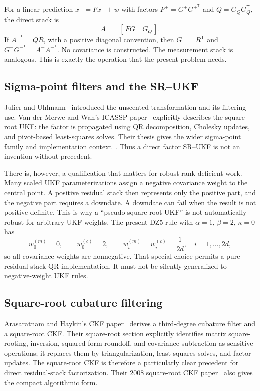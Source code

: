 \documentclass[11pt]{article}
\newcommand{\transpose}{^{\mathsf T}}
\begin{document}
For a linear prediction $x^-=Fx^++w$ with factors
$P^+=G^+G^{+\transpose}$ and $Q=G_QG_Q\transpose$, the direct stack is
\begin{equation}
 A^-=[\,FG^+\ \ G_Q\,].
 \label{eq:linear-pred-stack}
\end{equation}
If $A^{-\transpose}=QR$, with a positive diagonal convention, then
$G^-=R\transpose$ and
$G^-G^{-\transpose}=A^-A^{-\transpose}$.  No covariance is constructed.
The measurement stack is analogous.  This is exactly the operation that the
present problem needs.

\subsection{Sigma-point filters and the SR--UKF}

Julier and Uhlmann~\cite{julieruhlmann1997,julieruhlmann2004} introduced the
unscented transformation and its filtering use.  Van der Merwe and Wan's
ICASSP paper~\cite{vandermerwewan2001} explicitly describes the square-root
UKF: the factor is propagated using QR decomposition, Cholesky updates, and
pivot-based least-squares solves.  Their thesis gives the wider sigma-point
family and implementation context~\cite{vandermerwe2004}.  Thus a direct
factor SR--UKF is not an invention without precedent.

There is, however, a qualification that matters for robust rank-deficient work.
Many scaled UKF parameterizations assign a negative covariance weight to the
central point.  A positive residual stack then represents only the positive
part, and the negative part requires a downdate.  A downdate can fail when the
result is not positive definite.  This is why a ``pseudo square-root UKF'' is
not automatically robust for arbitrary UKF weights.  The present DZ5 rule with
$\alpha=1$, $\beta=2$, $\kappa=0$ has
\begin{equation}
 w_0^{(m)}=0,\qquad w_0^{(c)}=2,\qquad
 w_i^{(m)}=w_i^{(c)}=\frac{1}{2d},\quad i=1,\ldots,2d,
 \label{eq:dz5-weights}
\end{equation}
so all covariance weights are nonnegative.  That special choice permits a
pure residual-stack QR implementation.  It must not be silently generalized to
negative-weight UKF rules.

\subsection{Square-root cubature filtering}

Arasaratnam and Haykin's CKF paper~\cite{arasaratnamhaykin2009} derives a
third-degree cubature filter and a square-root CKF.  Their square-root section
explicitly identifies matrix square-rooting, inversion, squared-form roundoff,
and covariance subtraction as sensitive operations; it replaces them by
triangularization, least-squares solves, and factor updates.  The square-root
CKF is therefore a particularly clear precedent for direct residual-stack
factorization.  Their 2008 square-root CKF paper~\cite{arasaratnamhaykin2008}
also gives the compact algorithmic form.
\end{document}
